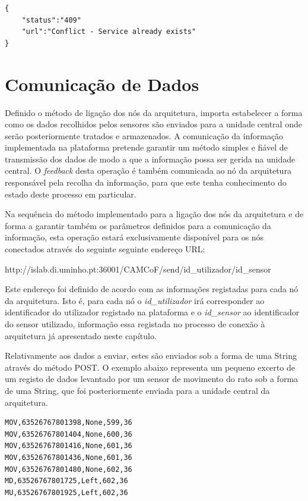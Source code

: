 \begin{lstlisting}[caption=Mensagem de conflito em JSON]
{
	"status":"409"
	"url":"Conflict - Service already exists"
}
\end{lstlisting}


\section{Comunicação de Dados}

Definido o método de ligação dos nós da arquitetura, importa estabelecer a forma como os dados recolhidos pelos sensores são enviados para a unidade central onde serão posteriormente tratados e armazenados. A comunicação da informação implementada na plataforma pretende garantir um método simples e fiável de transmissão dos dados de modo a que a informação possa ser gerida na unidade central. O \textit{feedback} desta operação é também comunicada ao nó da arquitetura responsável pela recolha da informação, para que este tenha conhecimento do estado deste processo em particular.

Na sequência do método implementado para a ligação dos nós da arquitetura e de forma a garantir também os parâmetros definidos para a comunicação da informação, esta operação estará exclusivamente disponível para os nós conectados através do seguinte seguinte endereço URL:

http://islab.di.uminho.pt:36001/CAMCoF/send/id\_utilizador/id\_sensor

Este endereço foi definido de acordo com as informações registadas para cada nó da arquitetura. Isto é, para cada nó o \textit{id\_utilizador} irá corresponder ao identificador do utilizador registado na plataforma e o \textit{id\_sensor} ao identificador do sensor utilizado, informação essa registada no processo de conexão à arquitetura já apresentado neste capítulo.

Relativamente aos dados a enviar, estes são enviados sob a forma de uma String através do método POST. O exemplo abaixo representa um pequeno excerto de um registo de dados levantado por um sensor de movimento do rato sob a forma de uma String, que foi posteriormente enviada para a unidade central da arquitetura.\\
\begin{lstlisting}[caption=Excerto de dados fornecidos pelo movimento do rato]
MOV,63526767801398,None,599,36
MOV,63526767801404,None,600,36
MOV,63526767801416,None,601,36
MOV,63526767801436,None,601,36
MOV,63526767801480,None,602,36
MD,63526767801725,Left,602,36
MU,63526767801925,Left,602,36
\end{lstlisting}



